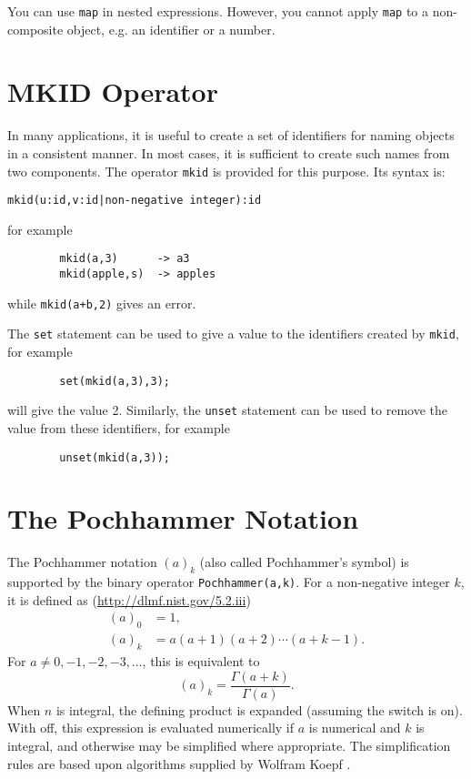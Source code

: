 You can use \texttt{map} in nested expressions. However, you cannot
apply \texttt{map} to a non-composite object, e.g. an identifier or a number.


\section{MKID Operator}
\hypertarget{operator:MKID}{}
In many applications, it is useful to create a set of identifiers for
naming objects in a consistent manner. In most cases, it is sufficient to
create such names from two components. The operator \texttt{mkid} is provided
for this purpose. Its syntax is:
\begin{verbatim}
mkid(u:id,v:id|non-negative integer):id
\end{verbatim}
for example
\begin{verbatim}
        mkid(a,3)      -> a3
        mkid(apple,s)  -> apples
\end{verbatim}
while \texttt{mkid(a+b,2)} gives an error.

The \texttt{set} statement can be used to give a value to the
identifiers created by \texttt{mkid}, for example
\begin{verbatim}
        set(mkid(a,3),3);
\end{verbatim}
will give  the value 2.
Similarly, the \texttt{unset} statement can be used to
remove the value from these identifiers, for example
\begin{verbatim}
        unset(mkid(a,3));
\end{verbatim}

\section{The Pochhammer Notation}
\hypertarget{POCH}{}
\hypertarget{operator:POCHHAMMER}{}
The Pochhammer notation $(a)_k$ (also called Pochhammer's symbol) is supported
by the binary operator \texttt{Pochhammer(a,k)}.
For a non-negative integer $k$, it is defined as
(\url{http://dlmf.nist.gov/5.2.iii})
\begin{align*}
  (a)_0 &= 1, \\
  (a)_k &= a(a+1)(a+2)\cdots(a+k-1).
\end{align*}
For $a \neq 0, -1, -2, -3, \ldots$, this is equivalent to
\[ (a)_k = \frac{\Gamma(a+k)}{\Gamma(a)}. \]
When $n$ is integral, the defining product is expanded (assuming the switch
 is on). With  off, this expression is evaluated
numerically if $a$ is numerical and $k$ is integral, and otherwise may be
simplified where appropriate.  The simplification rules are based upon
algorithms supplied by Wolfram Koepf \cite{Koepf:92}.

